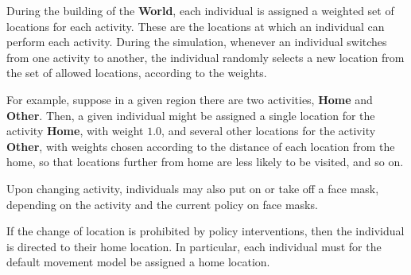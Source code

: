 \documentclass[10pt,letterpaper]{article}
\begin{document}
During the building of the \textbf{World}, each individual is assigned a weighted set of locations for each activity. These are the locations at which an individual can perform each activity. During the simulation, whenever an individual switches from one activity to another, the individual randomly selects a new location from the set of allowed locations, according to the weights.

For example, suppose in a given region there are two activities, \textbf{Home} and \textbf{Other}. Then, a given individual might be assigned a single location for the activity \textbf{Home}, with weight $1.0$, and several other locations for the activity \textbf{Other}, with weights chosen according to the distance of each location from the home, so that locations further from home are less likely to be visited, and so on.

Upon changing activity, individuals may also put on or take off a face mask, depending on the activity and the current policy on face masks.

If the change of location is prohibited by policy interventions, then the individual is directed to their home location. In particular, each individual must for the default movement model be assigned a home location.
\end{document}
